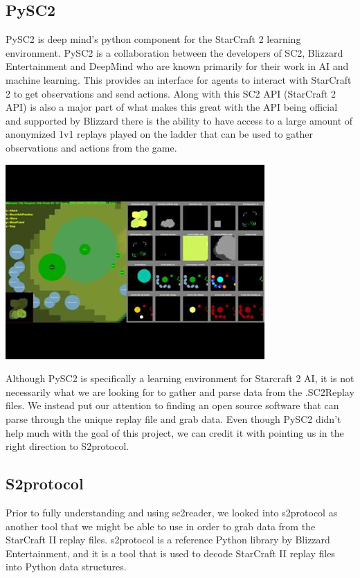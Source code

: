\documentclass[a4paper,12pt]{report}
\begin{document}
\subsection{PySC2}
PySC2 is deep mind’s python component for the StarCraft 2 learning environment. PySC2 is a collaboration between the developers of SC2, Blizzard Entertainment and DeepMind who are known primarily for their work in AI and machine learning. This provides an interface for agents to interact with StarCraft 2 to get observations and send actions. Along with this SC2 API (StarCraft 2 API) is also a major part of what makes this great with the API being official and supported by Blizzard there is the ability to have access to a large amount of anonymized 1v1 replays played on the ladder that can be used to gather observations and actions from the game.

\begin{center}
    \captionsetup{type=figure}
    \includegraphics[width=.9\linewidth]{media/PYSC2.png}
\end{center}

Although PySC2 is specifically a learning environment for Starcraft 2 AI, it is not necessarily what we are looking for to gather and parse data from the .SC2Replay files. We instead put our attention to finding an open source software that can parse through the unique replay file and grab data. Even though PySC2 didn’t help much with the goal of this project, we can credit it with pointing us in the right direction to S2protocol.

\subsection{S2protocol}
Prior to fully understanding and using sc2reader, we looked into s2protocol as another tool that we might be able to use in order to grab data from the StarCraft II replay files. s2protocol is a reference Python library by Blizzard Entertainment, and it is a tool that is used to decode StarCraft II replay files into Python data structures.
\end{document}
